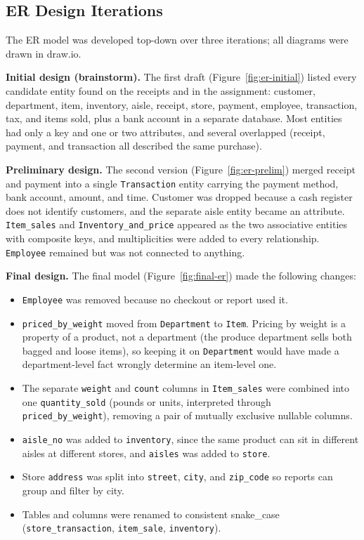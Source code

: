\documentclass[11pt,letterpaper]{article}
\begin{document}
\subsection{ER Design Iterations}
\label{sec:er-iterations}

The ER model was developed top-down over three iterations; all diagrams were drawn in draw.io.

\textbf{Initial design (brainstorm).} The first draft (Figure~\ref{fig:er-initial}) listed every candidate entity found on the receipts and in the assignment: customer, department, item, inventory, aisle, receipt, store, payment, employee, transaction, tax, and items sold, plus a bank account in a separate database. Most entities had only a key and one or two attributes, and several overlapped (receipt, payment, and transaction all described the same purchase).

\textbf{Preliminary design.} The second version (Figure~\ref{fig:er-prelim}) merged receipt and payment into a single \texttt{Transaction} entity carrying the payment method, bank account, amount, and time. Customer was dropped because a cash register does not identify customers, and the separate aisle entity became an attribute. \texttt{Item\_sales} and \texttt{Inventory\_and\_price} appeared as the two associative entities with composite keys, and multiplicities were added to every relationship. \texttt{Employee} remained but was not connected to anything.

\textbf{Final design.} The final model (Figure~\ref{fig:final-er}) made the following changes:
\begin{itemize}
    \item \texttt{Employee} was removed because no checkout or report used it.
    \item \texttt{priced\_by\_weight} moved from \texttt{Department} to \texttt{Item}. Pricing by weight is a property of a product, not a department (the produce department sells both bagged and loose items), so keeping it on \texttt{Department} would have made a department-level fact wrongly determine an item-level one.
    \item The separate \texttt{weight} and \texttt{count} columns in \texttt{Item\_sales} were combined into one \texttt{quantity\_sold} (pounds or units, interpreted through \texttt{priced\_by\_weight}), removing a pair of mutually exclusive nullable columns.
    \item \texttt{aisle\_no} was added to \texttt{inventory}, since the same product can sit in different aisles at different stores, and \texttt{aisles} was added to \texttt{store}.
    \item Store \texttt{address} was split into \texttt{street}, \texttt{city}, and \texttt{zip\_code} so reports can group and filter by city.
    \item Tables and columns were renamed to consistent snake\_case (\texttt{store\_transaction}, \texttt{item\_sale}, \texttt{inventory}).
\end{itemize}
\end{document}
